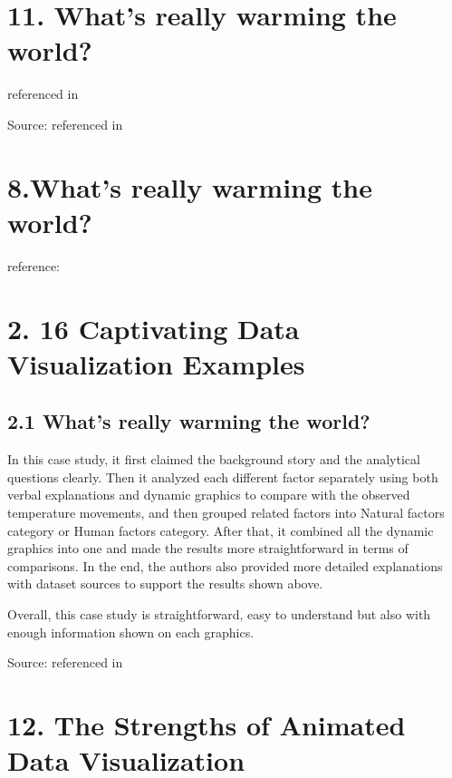 \documentclass[]{book}
\theoremstyle{definition}
\theoremstyle{definition}
\theoremstyle{definition}
\theoremstyle{remark}
\begin{document}
\section{11. What's really warming the
world?}\label{whats-really-warming-the-world}

\citep{world_warming} referenced in \citep{int_viz_1}

Source: \citep{Immigration} referenced in \citep{cool_data}

\section{8.What's really warming the
world?}\label{whats-really-warming-the-world-1}

reference:\citep{world_warming}

\section{\texorpdfstring{2. 16 Captivating Data Visualization Examples
\citep{int_viz_1}}{2. 16 Captivating Data Visualization Examples {[}@int\_viz\_1{]}}}\label{captivating-data-visualization-examples-int_viz_1}

\subsection{2.1 What's really warming the
world?}\label{whats-really-warming-the-world-2}

In this case study, it first claimed the background story and the
analytical questions clearly. Then it analyzed each different factor
separately using both verbal explanations and dynamic graphics to
compare with the observed temperature movements, and then grouped
related factors into Natural factors category or Human factors category.
After that, it combined all the dynamic graphics into one and made the
results more straightforward in terms of comparisons. In the end, the
authors also provided more detailed explanations with dataset sources to
support the results shown above.

Overall, this case study is straightforward, easy to understand but also
with enough information shown on each graphics.

Source: \citep{world_warming} referenced in \citep{int_viz_1}

\section{12. The Strengths of Animated Data
Visualization}\label{the-strengths-of-animated-data-visualization}
\end{document}
